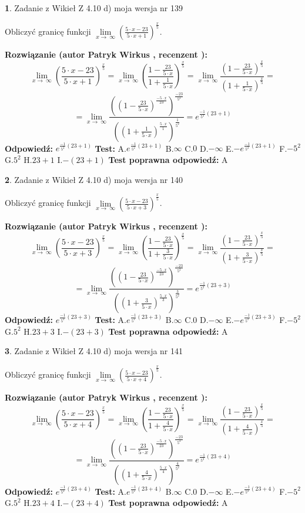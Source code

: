 \documentclass[12pt, a4paper]{article}
\theoremstyle{definition} %
\newtheorem{zad}{}
\newcommand{\zadStart}[1]{\begin{zad}#1\newline}
\newcommand{\zadStop}{\end{zad}}
\newcommand{\rozwStart}[2]{\noindent \textbf{Rozwiązanie (autor #1 , recenzent #2): }\newline}
\newcommand{\rozwStop}{\newline}
\newcommand{\odpStart}{\noindent \textbf{Odpowiedź:}\newline}
\newcommand{\odpStop}{\newline}
\newcommand{\testStart}{\noindent \textbf{Test:}\newline}
\newcommand{\testStop}{\newline}
\newcommand{\kluczStart}{\noindent \textbf{Test poprawna odpowiedź:}\newline}
\newcommand{\kluczStop}{\newline}
\begin{document}
\zadStart{Zadanie z Wikieł Z 4.10 d) moja wersja nr 139}


Obliczyć granicę funkcji  $\lim\limits_{x\to\ \infty}(\frac{5\cdot x-23}{5\cdot x+1})^{\frac{x}{5}}$.
\zadStop
\rozwStart{Patryk Wirkus}{}
$$\lim\limits_{x\to\ \infty}(\frac{5\cdot x-23}{5\cdot x+1})^{\frac{x}{5}} = \lim\limits_{x\to\ \infty}(\frac{1-\frac{23}{5\cdot x}}{1+\frac{1}{5\cdot x}})^{\frac{x}{5}}=\lim\limits_{x\to\ \infty}\frac{(1-\frac{23}{5\cdot x})^{\frac{x}{5}}}{(1+\frac{1}{5\cdot x})^{\frac{x}{5}}}=$$
$$=\lim\limits_{x\to\ \infty}\frac{((1-\frac{23}{5\cdot x})^{\frac{-5\cdot x}{23}})^{\frac{-23}{5^{2}}}}{((1+\frac{1}{5\cdot x})^{\frac{5\cdot x}{1}})^{\frac{1}{5^{2}}}}=e^{\frac{-1}{5^{2}}(23+1)}$$
\rozwStop
\odpStart
$e^{\frac{-1}{5^{2}}(23+1)}$
\odpStop
\testStart
A.$e^{\frac{-1}{5^{2}}(23+1)}$ B.$\infty$ C.$0$ D.$-\infty$ E.$-e^{\frac{-1}{5^{2}}(23+1)}$
F.$-5^{2}$ G.$5^{2}$
H.$23+1$
I.$-(23+1)$
\testStop
\kluczStart
A
\kluczStop



\zadStart{Zadanie z Wikieł Z 4.10 d) moja wersja nr 140}


Obliczyć granicę funkcji  $\lim\limits_{x\to\ \infty}(\frac{5\cdot x-23}{5\cdot x+3})^{\frac{x}{5}}$.
\zadStop
\rozwStart{Patryk Wirkus}{}
$$\lim\limits_{x\to\ \infty}(\frac{5\cdot x-23}{5\cdot x+3})^{\frac{x}{5}} = \lim\limits_{x\to\ \infty}(\frac{1-\frac{23}{5\cdot x}}{1+\frac{3}{5\cdot x}})^{\frac{x}{5}}=\lim\limits_{x\to\ \infty}\frac{(1-\frac{23}{5\cdot x})^{\frac{x}{5}}}{(1+\frac{3}{5\cdot x})^{\frac{x}{5}}}=$$
$$=\lim\limits_{x\to\ \infty}\frac{((1-\frac{23}{5\cdot x})^{\frac{-5\cdot x}{23}})^{\frac{-23}{5^{2}}}}{((1+\frac{3}{5\cdot x})^{\frac{5\cdot x}{3}})^{\frac{3}{5^{2}}}}=e^{\frac{-1}{5^{2}}(23+3)}$$
\rozwStop
\odpStart
$e^{\frac{-1}{5^{2}}(23+3)}$
\odpStop
\testStart
A.$e^{\frac{-1}{5^{2}}(23+3)}$ B.$\infty$ C.$0$ D.$-\infty$ E.$-e^{\frac{-1}{5^{2}}(23+3)}$
F.$-5^{2}$ G.$5^{2}$
H.$23+3$
I.$-(23+3)$
\testStop
\kluczStart
A
\kluczStop



\zadStart{Zadanie z Wikieł Z 4.10 d) moja wersja nr 141}


Obliczyć granicę funkcji  $\lim\limits_{x\to\ \infty}(\frac{5\cdot x-23}{5\cdot x+4})^{\frac{x}{5}}$.
\zadStop
\rozwStart{Patryk Wirkus}{}
$$\lim\limits_{x\to\ \infty}(\frac{5\cdot x-23}{5\cdot x+4})^{\frac{x}{5}} = \lim\limits_{x\to\ \infty}(\frac{1-\frac{23}{5\cdot x}}{1+\frac{4}{5\cdot x}})^{\frac{x}{5}}=\lim\limits_{x\to\ \infty}\frac{(1-\frac{23}{5\cdot x})^{\frac{x}{5}}}{(1+\frac{4}{5\cdot x})^{\frac{x}{5}}}=$$
$$=\lim\limits_{x\to\ \infty}\frac{((1-\frac{23}{5\cdot x})^{\frac{-5\cdot x}{23}})^{\frac{-23}{5^{2}}}}{((1+\frac{4}{5\cdot x})^{\frac{5\cdot x}{4}})^{\frac{4}{5^{2}}}}=e^{\frac{-1}{5^{2}}(23+4)}$$
\rozwStop
\odpStart
$e^{\frac{-1}{5^{2}}(23+4)}$
\odpStop
\testStart
A.$e^{\frac{-1}{5^{2}}(23+4)}$ B.$\infty$ C.$0$ D.$-\infty$ E.$-e^{\frac{-1}{5^{2}}(23+4)}$
F.$-5^{2}$ G.$5^{2}$
H.$23+4$
I.$-(23+4)$
\testStop
\kluczStart
A
\kluczStop
\end{document}
